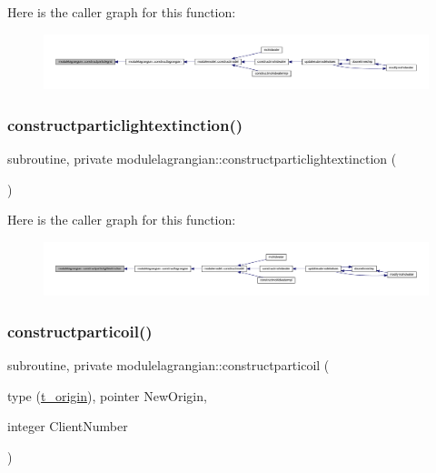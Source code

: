 Here is the caller graph for this function\+:\nopagebreak
\begin{figure}[H]
\begin{center}
\leavevmode
\includegraphics[width=350pt]{namespacemodulelagrangian_a190cd84669e94eedbb0ca723a973969c_icgraph}
\end{center}
\end{figure}
\mbox{\label{namespacemodulelagrangian_a30983416b73c9972c63df2c25371661d}} 
\subsubsection{\texorpdfstring{constructparticlightextinction()}{constructparticlightextinction()}}
{\footnotesize\ttfamily subroutine, private modulelagrangian\+::constructparticlightextinction (\begin{DoxyParamCaption}{ }\end{DoxyParamCaption})\hspace{0.3cm}{\ttfamily [private]}}

Here is the caller graph for this function\+:\nopagebreak
\begin{figure}[H]
\begin{center}
\leavevmode
\includegraphics[width=350pt]{namespacemodulelagrangian_a30983416b73c9972c63df2c25371661d_icgraph}
\end{center}
\end{figure}
\mbox{\label{namespacemodulelagrangian_a4ded42964190b91fb51481ee647db44a}} 
\subsubsection{\texorpdfstring{constructparticoil()}{constructparticoil()}}
{\footnotesize\ttfamily subroutine, private modulelagrangian\+::constructparticoil (\begin{DoxyParamCaption}\item[{type (\mbox{\hyperlink{structmodulelagrangian_1_1t__origin}{t\+\_\+origin}}), pointer}]{New\+Origin,  }\item[{integer}]{Client\+Number }\end{DoxyParamCaption})\hspace{0.3cm}{\ttfamily [private]}}

